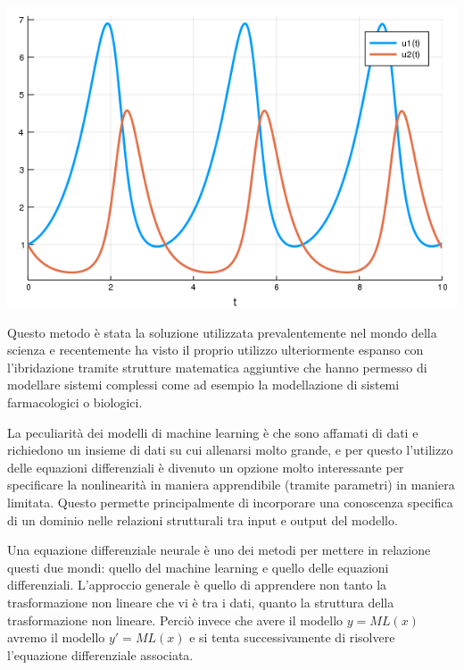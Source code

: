 \begin{minipage}{\linewidth}
    \centering
    \includegraphics[width=\textwidth]{img/lotkavolterra.png}
    \label{fig:lotkavolterra_example}
\end{minipage}

Questo metodo è stata la soluzione utilizzata prevalentemente nel mondo 
della scienza e recentemente ha visto il proprio utilizzo ulteriormente 
espanso con l'ibridazione tramite strutture matematica aggiuntive che 
hanno permesso di modellare sistemi complessi come ad esempio la modellazione 
di sistemi farmacologici o biologici.

La peculiarità dei modelli di machine learning è che sono affamati di dati 
e richiedono un insieme di dati su cui allenarsi molto grande, e per questo 
l'utilizzo delle equazioni differenziali è divenuto un opzione molto 
interessante per specificare la nonlinearità in maniera apprendibile
(tramite parametri) in maniera limitata. Questo permette principalmente di 
incorporare una conoscenza specifica di un dominio nelle relazioni strutturali 
tra input e output del modello. 

Una equazione differenziale neurale è uno dei metodi per mettere in relazione
questi due mondi: quello del machine learning e quello delle equazioni differenziali.
L'approccio generale è quello di apprendere non tanto la trasformazione
non lineare che vi è tra i dati, quanto la struttura della trasformazione non 
lineare. Perciò invece che avere il modello $y = ML(x)$ avremo il modello 
$y' = ML(x)$ e si tenta successivamente di risolvere l'equazione differenziale 
associata.

